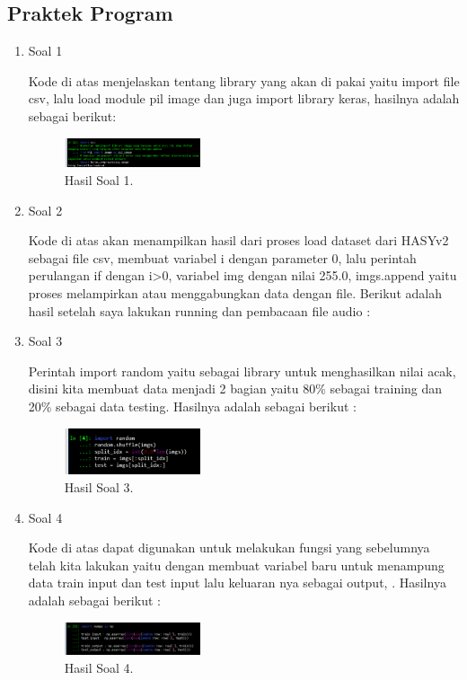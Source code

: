 \subsection{Praktek Program}
\begin{enumerate}
	\item Soal 1
	\hfill\break
	
	Kode di atas menjelaskan tentang library yang akan di pakai yaitu import file csv, lalu load module pil image dan juga import library keras, hasilnya adalah sebagai berikut:
	\begin{figure}[H]
	\centering
		\includegraphics[width=4cm]{figures/1174080/7/materi/hasil1.PNG}
		\caption{Hasil Soal 1.}
	\end{figure}

	\item Soal 2
	\hfill\break
	
	Kode di atas akan menampilkan hasil dari proses load dataset dari HASYv2 sebagai file csv, membuat variabel i dengan parameter 0, lalu perintah perulangan if dengan i>0, variabel img dengan nilai 255.0, imgs.append yaitu  proses melampirkan atau menggabungkan data dengan file. Berikut adalah hasil setelah saya lakukan running dan pembacaan file audio :

	\item Soal 3
	\hfill\break
	
	Perintah import random yaitu sebagai library untuk menghasilkan nilai acak, disini kita membuat data menjadi 2 bagian yaitu 80\% sebagai training dan 20\% sebagai data testing. Hasilnya adalah sebagai berikut :
	\begin{figure}[H]
	\centering
		\includegraphics[width=4cm]{figures/1174080/7/materi/hasil3.PNG}
		\caption{Hasil Soal 3.}
	\end{figure}

	\item Soal 4
	\hfill\break
	
	Kode di atas dapat digunakan untuk melakukan fungsi yang sebelumnya telah kita lakukan yaitu dengan membuat variabel baru untuk menampung data train input dan test input lalu keluaran nya sebagai output, . Hasilnya adalah sebagai berikut :
	\begin{figure}[H]
	\centering
		\includegraphics[width=4cm]{figures/1174080/7/materi/hasil4.PNG}
		\caption{Hasil Soal 4.}
	\end{figure}


\end{enumerate}
